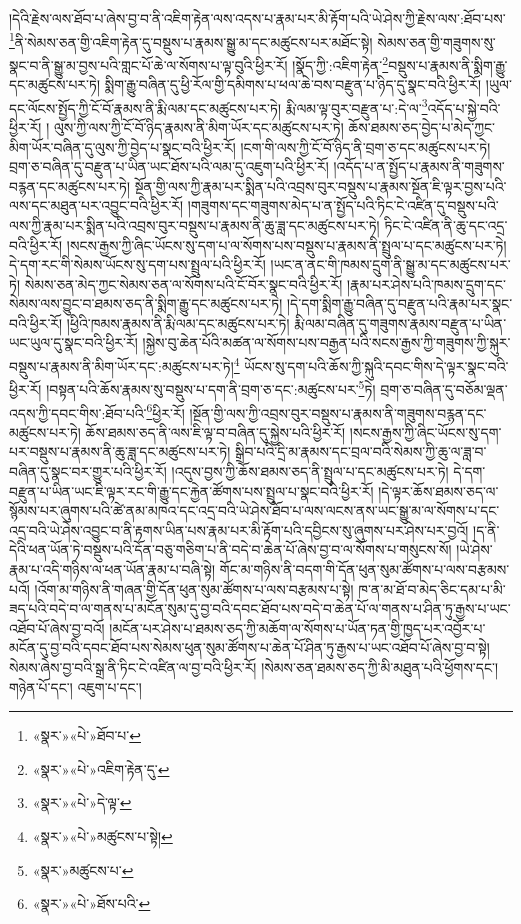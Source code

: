 །དེའི་རྗེས་ལས་ཐོབ་པ་ཞེས་བྱ་བ་ནི་འཇིག་རྟེན་ལས་འདས་པ་རྣམ་པར་མི་རྟོག་པའི་ཡེ་ཤེས་ཀྱི་རྗེས་ལས་:ཐོབ་པས་\footnote{«སྣར་»«པེ་»ཐོབ་པ་}ནི་སེམས་ཅན་གྱི་འཇིག་རྟེན་དུ་བསྡུས་པ་རྣམས་སྒྱུ་མ་དང་མཚུངས་པར་མཐོང་སྟེ། སེམས་ཅན་གྱི་གཟུགས་སུ་སྣང་བ་ནི་སྒྱུ་མ་བྱས་པའི་གླང་པོ་ཆེ་ལ་སོགས་པ་ལྟ་བུའི་ཕྱིར་རོ། །སྣོད་ཀྱི་:འཇིག་རྟེན་\footnote{«སྣར་»«པེ་»འཇིག་རྟེན་དུ་}བསྡུས་པ་རྣམས་ནི་སྨིག་རྒྱུ་དང་མཚུངས་པར་ཏེ། སྨིག་རྒྱུ་བཞིན་དུ་ཕྱི་རོལ་གྱི་དམིགས་པ་ཕལ་ཆེ་བས་བརྫུན་པ་ཉིད་དུ་སྣང་བའི་ཕྱིར་རོ། །ཡུལ་དང་ལོངས་སྤྱོད་ཀྱི་ངོ་བོ་རྣམས་ནི་རྨི་ལམ་དང་མཚུངས་པར་ཏེ། རྨི་ལམ་ལྟ་བུར་བརྫུན་པ་:དེ་ལ་\footnote{«སྣར་»«པེ་»དེ་ལྟ་}འདོད་པ་སྐྱེ་བའི་ཕྱིར་རོ། །
ལུས་ཀྱི་ལས་ཀྱི་ངོ་བོ་ཉིད་རྣམས་ནི་མིག་ཡོར་དང་མཚུངས་པར་ཏེ། ཆོས་ཐམས་ཅད་བྱེད་པ་མེད་ཀྱང་མིག་ཡོར་བཞིན་དུ་ལུས་ཀྱི་བྱེད་པ་སྣང་བའི་ཕྱིར་རོ། །ངག་གི་ལས་ཀྱི་ངོ་བོ་ཉིད་ནི་བྲག་ཅ་དང་མཚུངས་པར་ཏེ། བྲག་ཅ་བཞིན་དུ་བརྫུན་པ་ཡིན་ཡང་ཐོས་པའི་ལམ་དུ་འཇུག་པའི་ཕྱིར་རོ། །འདོད་པ་ན་སྤྱོད་པ་རྣམས་ནི་གཟུགས་བརྙན་དང་མཚུངས་པར་ཏེ། སྔོན་གྱི་ལས་ཀྱི་རྣམ་པར་སྨིན་པའི་འབྲས་བུར་བསྡུས་པ་རྣམས་སྔོན་ཇི་ལྟར་བྱས་པའི་ལས་དང་མཐུན་པར་འབྱུང་བའི་ཕྱིར་རོ། །གཟུགས་དང་གཟུགས་མེད་པ་ན་སྤྱོད་པའི་ཏིང་ངེ་འཛིན་དུ་བསྡུས་པའི་ལས་ཀྱི་རྣམ་པར་སྨིན་པའི་འབྲས་བུར་བསྡུས་པ་རྣམས་ནི་ཆུ་ཟླ་དང་མཚུངས་པར་ཏེ། ཏིང་ངེ་འཛིན་ནི་ཆུ་དང་འདྲ་བའི་ཕྱིར་རོ། །སངས་རྒྱས་ཀྱི་ཞིང་ཡོངས་སུ་དག་པ་ལ་སོགས་པས་བསྡུས་པ་རྣམས་ནི་སྤྲུལ་པ་དང་མཚུངས་པར་ཏེ། དེ་དག་རང་གི་སེམས་ཡོངས་སུ་དག་པས་སྤྲུལ་པའི་ཕྱིར་རོ། །ཡང་ན་ནང་གི་ཁམས་དྲུག་ནི་སྒྱུ་མ་དང་མཚུངས་པར་ཏེ། སེམས་ཅན་མེད་ཀྱང་སེམས་ཅན་ལ་སོགས་པའི་ངོ་བོར་སྣང་བའི་ཕྱིར་རོ། །རྣམ་པར་ཤེས་པའི་ཁམས་དྲུག་དང་སེམས་ལས་བྱུང་བ་ཐམས་ཅད་ནི་སྨིག་རྒྱུ་དང་མཚུངས་པར་ཏེ། །དེ་དག་སྨིག་རྒྱུ་བཞིན་དུ་བརྫུན་པའི་རྣམ་པར་སྣང་བའི་ཕྱིར་རོ། །ཕྱིའི་ཁམས་རྣམས་ནི་རྨི་ལམ་དང་མཚུངས་པར་ཏེ། རྨི་ལམ་བཞིན་དུ་གཟུགས་རྣམས་བརྫུན་པ་ཡིན་ཡང་ཡུལ་དུ་སྣང་བའི་ཕྱིར་རོ། །སྐྱེས་བུ་ཆེན་པོའི་མཚན་ལ་སོགས་པས་བརྒྱན་པའི་སངས་རྒྱས་ཀྱི་གཟུགས་ཀྱི་སྐུར་བསྡུས་པ་རྣམས་ནི་མིག་ཡོར་དང་:མཚུངས་པར་ཏེ།\footnote{«སྣར་»«པེ་»མཚུངས་པ་སྟེ།} ཡོངས་སུ་དག་པའི་ཆོས་ཀྱི་སྐུའི་དབང་གིས་དེ་ལྟར་སྣང་བའི་ཕྱིར་རོ། །བསྟན་པའི་ཆོས་རྣམས་སུ་བསྡུས་པ་དག་ནི་བྲག་ཅ་དང་:མཚུངས་པར་\footnote{«སྣར་»མཚུངས་པ་}ཏེ། བྲག་ཅ་བཞིན་དུ་བཅོམ་ལྡན་འདས་ཀྱི་དབང་གིས་:ཐོབ་པའི་\footnote{«སྣར་»«པེ་»ཐོས་པའི་}ཕྱིར་རོ། །སྔོན་གྱི་ལས་ཀྱི་འབྲས་བུར་བསྡུས་པ་རྣམས་ནི་གཟུགས་བརྙན་དང་མཚུངས་པར་ཏེ། ཆོས་ཐམས་ཅད་ནི་ལས་ཇི་ལྟ་བ་བཞིན་དུ་སྐྱེས་པའི་ཕྱིར་རོ། །སངས་རྒྱས་ཀྱི་ཞིང་ཡོངས་སུ་དག་པར་བསྡུས་པ་རྣམས་ནི་ཆུ་ཟླ་དང་མཚུངས་པར་ཏེ། སྒྲིབ་པའི་དྲི་མ་རྣམས་དང་བྲལ་བའི་སེམས་ཀྱི་ཆུ་ལ་ཟླ་བ་བཞིན་དུ་སྣང་བར་གྱུར་པའི་ཕྱིར་རོ། །འདུས་བྱས་ཀྱི་ཆོས་ཐམས་ཅད་ནི་སྤྲུལ་པ་དང་མཚུངས་པར་ཏེ། དེ་དག་བརྫུན་པ་ཡིན་ཡང་ཇི་ལྟར་རང་གི་རྒྱུ་དང་རྐྱེན་ཚོགས་པས་སྤྲུལ་པ་སྣང་བའི་ཕྱིར་རོ། །དེ་ལྟར་ཆོས་ཐམས་ཅད་ལ་སྙོམས་པར་ཞུགས་པའི་ཚེ་ནམ་མཁའ་དང་འདྲ་བའི་ཡེ་ཤེས་ཐོབ་པ་ལས་ལངས་ནས་ཡང་སྒྱུ་མ་ལ་སོགས་པ་དང་འདྲ་བའི་ཡེ་ཤེས་འབྱུང་བ་ནི་རྟགས་ཡིན་པས་རྣམ་པར་མི་རྟོག་པའི་དབྱིངས་སུ་ཞུགས་པར་ཤེས་པར་བྱའོ། །ད་ནི་དེའི་ཕན་ཡོན་ཏེ་བསྡུས་པའི་དོན་བཅུ་གཅིག་པ་ནི་བདེ་བ་ཆེན་པོ་ཞེས་བྱ་བ་ལ་སོགས་པ་གསུངས་སོ། །ཡེ་ཤེས་རྣམ་པ་འདི་གཉིས་ལ་ཕན་ཡོན་རྣམ་པ་བཞི་སྟེ། གོང་མ་གཉིས་ནི་བདག་གི་དོན་ཕུན་སུམ་ཚོགས་པ་ལས་བརྩམས་པའོ། །འོག་མ་གཉིས་ནི་གཞན་གྱི་དོན་ཕུན་སུམ་ཚོགས་པ་ལས་བརྩམས་པ་སྟེ། ཁ་ན་མ་ཐོ་བ་མེད་ཅིང་དམ་པ་མི་ཟད་པའི་བདེ་བ་ལ་གནས་པ་མངོན་སུམ་དུ་བྱ་བའི་དབང་ཐོབ་པས་བདེ་བ་ཆེན་པོ་ལ་གནས་པ་ཤིན་ཏུ་རྒྱས་པ་ཡང་འཐོབ་པོ་ཞེས་བྱ་བའོ། །མངོན་པར་ཤེས་པ་ཐམས་ཅད་ཀྱི་མཆོག་ལ་སོགས་པ་ཡོན་ཏན་གྱི་ཁྱད་པར་འབྱོར་པ་མངོན་དུ་བྱ་བའི་དབང་ཐོབ་པས་སེམས་ཕུན་སུམ་ཚོགས་པ་ཆེན་པོ་ཤིན་ཏུ་རྒྱས་པ་ཡང་འཐོབ་པོ་ཞེས་བྱ་བ་སྟེ། སེམས་ཞེས་བྱ་བའི་སྒྲ་ནི་ཏིང་ངེ་འཛིན་ལ་བྱ་བའི་ཕྱིར་རོ། །སེམས་ཅན་ཐམས་ཅད་ཀྱི་མི་མཐུན་པའི་ཕྱོགས་དང་། གཉེན་པོ་དང་། འཇུག་པ་དང་། 